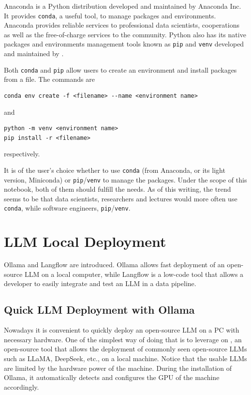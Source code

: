 \begin{shortbox}

Anaconda is a Python distribution developed and maintained by Anaconda Inc. It provides \verb|conda|, a useful tool, to manage packages and environments. Anaconda provides reliable services to professional data scientists, cooperations as well as the free-of-charge services to the community. Python also has its native packages and environments management tools known as \verb|pip| and \verb|venv| developed and maintained by .

Both \verb|conda| and \verb|pip| allow users to create an environment and install packages from a file. The commands are
\begin{lstlisting}
conda env create -f <filename> --name <environment name>
\end{lstlisting}
and
\begin{lstlisting}
python -m venv <environment name>
pip install -r <filename>
\end{lstlisting}
respectively.

It is of the user's choice whether to use \verb|conda| (from Anaconda, or its light version, Miniconda) or \verb|pip|/\verb|venv| to manage the packages. Under the scope of this notebook, both of them should fulfill the needs. As of this writing, the trend seems to be that data scientists, researchers and lectures would more often use \verb|conda|, while software engineers, \verb|pip|/\verb|venv|.
\end{shortbox}

\section{LLM Local Deployment}

Ollama and Langflow are introduced. Ollama allows fast deployment of an open-source LLM on a local computer, while Langflow is a low-code tool that allows a developer to easily integrate and test an LLM in a data pipeline.

\subsection{Quick LLM Deployment with Ollama}

Nowadays it is convenient to quickly deploy an open-source LLM on a PC with necessary hardware. One of the simplest way of doing that is to leverage on , an open-source tool that allows the deployment of commonly seen open-source LLMs such as LLaMA, DeepSeek, etc., on a local machine. Notice that the usable LLMs are limited by the hardware power of the machine. During the installation of Ollama, it automatically detects and configures the GPU of the machine accordingly.

